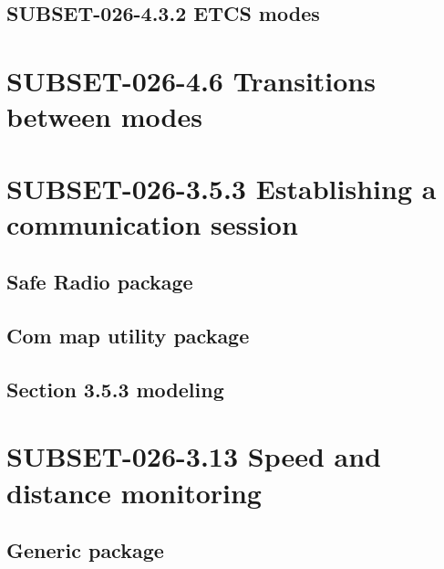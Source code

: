\documentclass{template/openetcs_report}
\begin{document}
\subsection{SUBSET-026-4.3.2 ETCS modes}



\section{SUBSET-026-4.6 Transitions between modes}





\section{SUBSET-026-3.5.3 Establishing a communication session}

\subsection{Safe Radio package}




\subsection{Com map utility package}



\subsection{Section 3.5.3 modeling}




\section{SUBSET-026-3.13 Speed and distance monitoring}

\subsection{Generic package}
\end{document}
